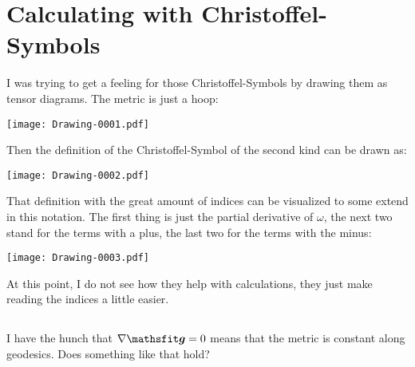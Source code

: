 \section{Calculating with Christoffel-Symbols}

I was trying to get a feeling for those Christoffel-Symbols by drawing them as
tensor diagrams. The metric is just a hoop:
\begin{center}
    \texttt{[image: Drawing-0001.pdf]}
\end{center}

Then the definition of the Christoffel-Symbol of the second kind can be drawn
as:
\begin{center}
    \texttt{[image: Drawing-0002.pdf]}
\end{center}

That definition with the great amount of indices can be visualized to some
extend in this notation. The first thing is just the partial derivative of
$\omega$, the next two stand for the terms with a plus, the last two for the
terms with the minus:
\begin{center}
    \texttt{[image: Drawing-0003.pdf]}
\end{center}

At this point, I do not see how they help with calculations, they just make
reading the indices a little easier.

\subsection{}

\begin{aside}
    I have the hunch that $\nabla \tens g = 0$ means that the metric is
    constant along geodesics. Does something like that hold?
\end{aside}

\newcommand\csk[3]{\Gamma^{#1}_{{#2}{#3}}}

